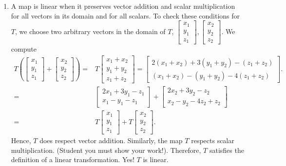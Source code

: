 \begin{SaveQuestion}
\begin{enumerate}
        \item A map is linear when it preserves vector addition and scalar multiplication for all vectors in its domain and for all scalars. To check these conditions for $T$, we choose two arbitrary vectors in the domain of $T$, $\begin{bmatrix}x_1\\y_1 \\z_1 \end{bmatrix}, \begin{bmatrix}x_2\\y_2 \\z_2 \end{bmatrix}$. We compute  
		$$
		\begin{aligned}
		T\left(\begin{bmatrix}x_1\\y_1 \\z_1 \end{bmatrix} +  \begin{bmatrix}x_2\\y_2 \\z_2 \end{bmatrix} \right) =& 
        T \begin{bmatrix}x_1 +x_2\\y_1+y_2 \\z_1+z_2 \end{bmatrix}  
		= 
		\begin{bmatrix} 2(x_1+x_2) + 3(y_1+y_2) -(z_1+z_2)\\ (x_1+x_2) -(y_1+y_2)-4(z_1+z_2)\end{bmatrix}. \\ = &   
		\begin{bmatrix} 2x_1+ 3y_1 - z_1 \\ x_1 -y_1-z_1\end{bmatrix} +  \begin{bmatrix} 2x_2 + 3y_2 -z_2\\ x_2 -y_2-4z_2+z_2\end{bmatrix} \\ =&
		T\begin{bmatrix}x_1\\y_1 \\z_1 \end{bmatrix} + T \begin{bmatrix}x_2\\y_2 \\z_2 \end{bmatrix}.
		\end{aligned}$$
Hence, $T$ does respect vector addition. Similarly, the map $T$ respects scalar multiplication. (Student you must show your work!). Therefore, $T$ satisfies the definition of a linear transformation. Yes! $T$ is linear.
        

\end{enumerate}
\end{SaveQuestion}
